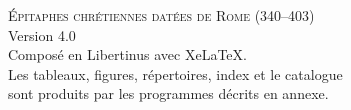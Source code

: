 \cleardoublepage
\thispagestyle{empty}
\vspace*{\fill}
\begin{center}
\small
\textsc{Épitaphes chrétiennes datées de Rome (340–403)}\\[4pt]
Version 4.0\\[10pt]
Composé en Libertinus avec XeLaTeX.\\
Les tableaux, figures, répertoires, index et le catalogue\\
sont produits par les programmes décrits en annexe.
\end{center}
\vspace*{\fill}
